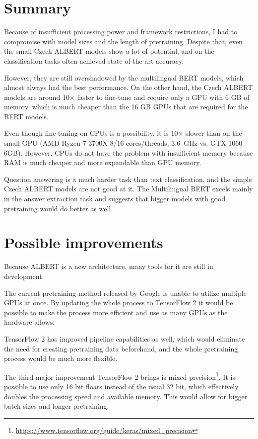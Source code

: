 \documentclass[
  printed, %
  color,   %
  table,   %
  oneside, %
  lof,     %
  lot,     %
]{fithesis3}
\begin{document}

\section{Summary}

Because of insufficient processing power and framework restrictions, I had to compromise with model sizes and the length of pretraining. Despite that, even the small Czech ALBERT models show a lot of potential, and on the classification tasks often achieved state-of-the-art accuracy.

However, they are still overshadowed by the multilingual BERT models, which almost always had the best performance. On the other hand, the Czech ALBERT models are around 10$\times$ faster to fine-tune and require only a GPU with 6 GB of memory, which is much cheaper than the 16 GB GPUs that are required for the BERT models.

Even though fine-tuning on CPUs is a possibility, it is 10$\times$ slower than on the small GPU (AMD Ryzen 7 3700X 8/16 cores/threads, 3.6~GHz vs. GTX 1060 6GB). However, CPUs do not have the problem with insufficient memory because RAM is much cheaper and more expandable than GPU memory.

Question answering is a much harder task than text classification, and the simple Czech ALBERT models are not good at it. The Multilingual BERT excels mainly in the answer extraction task and suggests that bigger models with good pretraining would do better as well.

\section{Possible improvements}
 Because ALBERT is a new architecture, many tools for it are still in development.

The current pretraining method released by Google is unable to utilize multiple GPUs at once. By updating the whole process to TensorFlow 2 it would be possible to make the process more efficient and use as many GPUs as the hardware allows.

TensorFlow 2 has improved pipeline capabilities as well, which would eliminate the need for creating pretraining data beforehand, and the whole pretraining process would be much more flexible.

The third major improvement TensorFlow 2 brings is mixed precision\footnote{\url{https://www.tensorflow.org/guide/keras/mixed_precision}}. It is possible to use only 16 bit floats instead of the usual 32 bit, which effectively doubles the processing speed and available memory. This would allow for bigger batch sizes and longer pretraining. 
\end{document}
